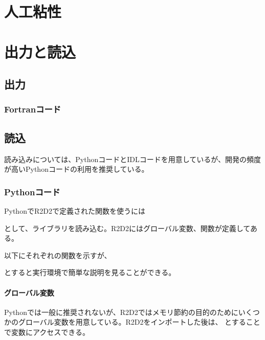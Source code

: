 \documentclass[letterpaper,10pt,dvipdfmx,report]{sphinxmanual}
\begin{document}
\chapter{人工粘性}
\label{\detokenize{artdif:id1}}\label{\detokenize{artdif::doc}}

\chapter{出力と読込}
\label{\detokenize{io:id1}}\label{\detokenize{io::doc}}

\section{出力}
\label{\detokenize{io:id2}}

\subsection{Fortranコード}
\label{\detokenize{io:fortran}}

\section{読込}
\label{\detokenize{io:id3}}
読み込みについては、PythonコードとIDLコードを用意しているが、開発の頻度が高いPythonコードの利用を推奨している。


\subsection{Pythonコード}
\label{\detokenize{io:python}}
PythonでR2D2で定義された関数を使うには

\begin{sphinxVerbatim}[commandchars=\\\{\}]
 
\end{sphinxVerbatim}

として、ライブラリを読み込む。R2D2にはグローバル変数、関数が定義してある。

以下にそれぞれの関数を示すが、

\begin{sphinxVerbatim}[commandchars=\\\{\}]
\end{sphinxVerbatim}

とすると実行環境で簡単な説明を見ることができる。


\subsubsection{グローバル変数}
\label{\detokenize{io:id4}}
Pythonでは一般に推奨されないが、R2D2ではメモリ節約の目的のためにいくつかのグローバル変数を用意している。R2D2をインポートした後は、 とすることで変数にアクセスできる。
\end{document}
